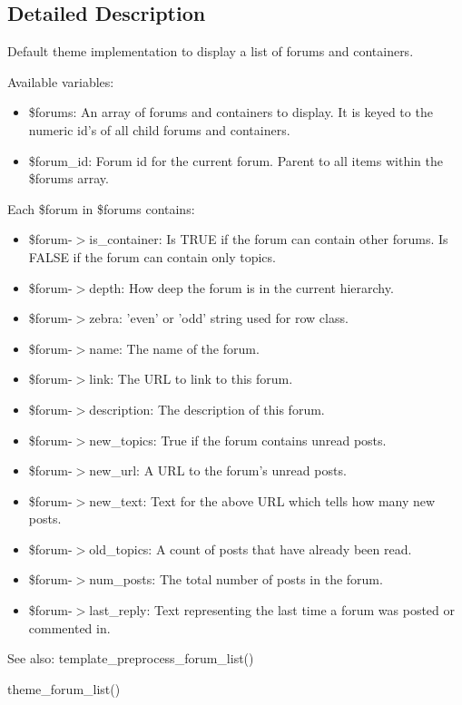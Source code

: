 \subsection{Detailed Description}
Default theme implementation to display a list of forums and containers.

Available variables:\begin{itemize}
\item \$forums: An array of forums and containers to display. It is keyed to the numeric id's of all child forums and containers.\item \$forum\_\-id: Forum id for the current forum. Parent to all items within the \$forums array.\end{itemize}


Each \$forum in \$forums contains:\begin{itemize}
\item \$forum-$>$is\_\-container: Is TRUE if the forum can contain other forums. Is FALSE if the forum can contain only topics.\item \$forum-$>$depth: How deep the forum is in the current hierarchy.\item \$forum-$>$zebra: 'even' or 'odd' string used for row class.\item \$forum-$>$name: The name of the forum.\item \$forum-$>$link: The URL to link to this forum.\item \$forum-$>$description: The description of this forum.\item \$forum-$>$new\_\-topics: True if the forum contains unread posts.\item \$forum-$>$new\_\-url: A URL to the forum's unread posts.\item \$forum-$>$new\_\-text: Text for the above URL which tells how many new posts.\item \$forum-$>$old\_\-topics: A count of posts that have already been read.\item \$forum-$>$num\_\-posts: The total number of posts in the forum.\item \$forum-$>$last\_\-reply: Text representing the last time a forum was posted or commented in.\end{itemize}


\begin{Desc}
\item[See also:]template\_\-preprocess\_\-forum\_\-list() 

theme\_\-forum\_\-list() \end{Desc}
